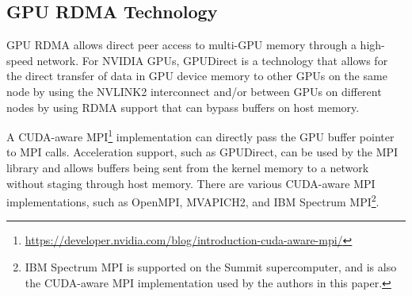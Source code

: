 \subsection{GPU RDMA Technology}
GPU RDMA allows direct peer access to multi-GPU memory through a high-speed network. 
%
For NVIDIA GPUs, GPUDirect is a technology that allows for the direct transfer of data in GPU device memory to other GPUs on the same node by using the NVLINK2 interconnect and/or between GPUs on different nodes by using RDMA support that can bypass buffers on host memory. 

A CUDA-aware MPI\footnote{\url{https://developer.nvidia.com/blog/introduction-cuda-aware-mpi/}} implementation can directly pass the GPU buffer pointer to MPI calls. Acceleration support, such as GPUDirect, can be used by the MPI library 
and allows buffers being sent from the kernel memory to a network without 
staging through host memory. There are various CUDA-aware MPI implementations, such as OpenMPI, MVAPICH2, and 
IBM Spectrum MPI\footnote{IBM Spectrum MPI is supported on
the Summit supercomputer, and is also the CUDA-aware MPI implementation used by the authors in this paper.}.
